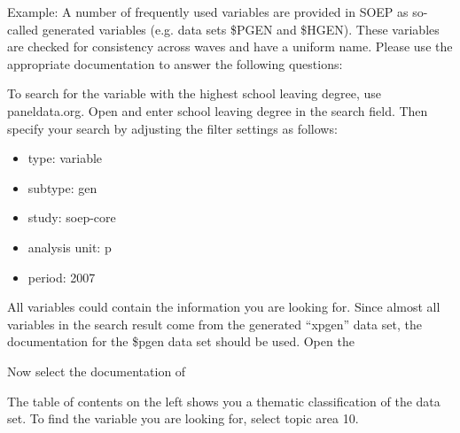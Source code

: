 \documentclass[letterpaper,10pt,openany,onesideH,english]{sphinxmanual}
\begin{document}
Example: A number of frequently used variables are provided in SOEP as so-called generated variables (e.g. data sets \$PGEN and \$HGEN). These variables are checked for consistency across waves and have a uniform name. Please use the appropriate documentation to answer the following questions:


To search for the variable with the highest school leaving degree, use paneldata.org. Open  and enter school leaving degree in the search field. Then specify your search by adjusting the filter settings as follows:
\begin{itemize}
\item {} 
type: variable

\item {} 
subtype: gen

\item {} 
study: soep-core

\item {} 
analysis unit: p

\item {} 
period: 2007

\end{itemize}

\begin{figure}[H]
\centering

\noindent{}
\end{figure}

All variables could contain the information you are looking for. Since almost all variables in the search result come from the generated “xpgen” data set, the documentation for the \$pgen data set should be used.
Open the 

\begin{figure}[H]
\centering

\noindent{}
\end{figure}

Now select the documentation of 

\begin{figure}[H]
\centering

\noindent{}
\end{figure}

The table of contents on the left shows you a thematic classification of the data set. To find the variable you are looking for, select topic area 10.
\end{document}
